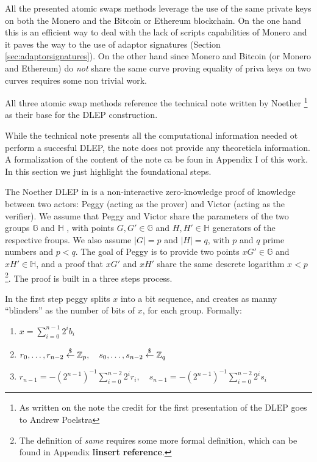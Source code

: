 \documentclass[runningheads]{llncs}
\newcommand{\getsrandom}{\overset{\tiny{\$}}{\leftarrow}}
\newcommand{\ggroup}{\mathbb{G}}
\newcommand{\hgroup}{\mathbb{H}}
\newcommand{\ggrouptxt}{$\mathbb{G}$ }
\newcommand{\hgrouptxt}{$\mathbb{H}$ }
\newcommand{\Zp}{\mathbb{Z}_p}
\newcommand{\Zq}{\mathbb{Z}_q}
\begin{document}
All the presented atomic swaps methods leverage the use of the same private keys on both the Monero and the Bitcoin or Ethereum blockchain. On the one hand this is an efficient way to deal with the lack of scripts capabilities of Monero and it paves the way to the use of adaptor signatures (Section \ref{sec:adaptorsignatures}). On the other hand since Monero and Bitcoin (or Monero and Ethereum) do \emph{not} share the same curve proving equality of priva keys on two curves requires some non trivial work.

All three atomic swap methods reference the technical note written by Noether \footnote{As written on the note the credit for the first presentation of the DLEP goes to Andrew Poelstra} \cite{dlep} as their base for the DLEP construction.

While the technical note presents all the computational information needed ot perform a succesful DLEP, the note does not provide any theoreticla information. A formalization of the content of the note ca be foun in Appendix I of this work. In this section we just highlight the foundational steps.

The Noether DLEP in \cite{dlep} is a non-interactive zero-knowledge proof of knowledge between two actors: Peggy (acting as the prover) and Victor (acting as the verifier). We assume that Peggy and Victor share the parameters of the two groups \ggrouptxt and \hgrouptxt, with points $G,G'\in\ggroup$ and $H,H' \in\hgroup$ generators of the respective froups. We also assume $|G|=p$ and $|H|=q$, with $p$ and $q$ prime numbers and $p<q$. The goal of Peggy is to provide two points $xG'\in\ggroup$ and $xH'\in\hgroup$, and a proof that $xG'$ and $xH'$ share the same descrete logarithm $x<p$\footnote{The definition of \emph{same} requires some more formal definition, which can be found in Appendix I\textbf{insert reference}.}. The proof is built in a three steps process.

In the first step peggy splits $x$ into a bit sequence, and creates as manny ``blinders'' as the number of bits of $x$, for each group. Formally:
\begin{enumerate}
    \item $x=\sum_{i=0}^{n-1} 2^ib_i$
    \item $r_0,\dots,r_{n-2}\getsrandom\Zp,\quad s_0,\dots,s_{n-2}\getsrandom\Zq$
    \item $r_{n-1}=-(2^{n-1})^{-1}\sum_{i=0}^{n-2} 2^ir_i,\quad s_{n-1}=-(2^{n-1})^{-1}\sum_{i=0}^{n-2} 2^is_i$
\end{enumerate}
\end{document}
